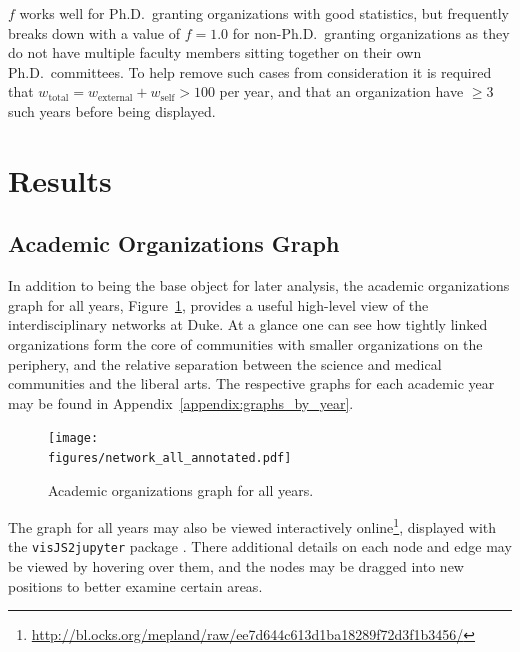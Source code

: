 \documentclass[notitlepage,aps,prd,nofootinbib]{revtex4-1}
\newcommand{\figures}{../outputs/plots}
\begin{document}
$f$ works well for Ph.D.\ granting organizations with good statistics, but frequently breaks down with a value of $f=1.0$ for non-Ph.D.\ granting organizations as they do not have multiple faculty members sitting together on their own Ph.D.\ committees. To help remove such cases from consideration it is required that $w_{\text{total}} = w_{\text{external}} + w_{\text{self}} > 100$ per year, and that an organization have $\geq 3$ such years before being displayed.


\section{Results}
\subsection{Academic Organizations Graph}

In addition to being the base object for later analysis, the academic organizations graph for all years, Figure~\ref{fig:graph_all_years}, provides a useful high-level view of the interdisciplinary networks at Duke. At a glance one can see how tightly linked organizations form the core of communities with smaller organizations on the periphery, and the relative separation between the science and medical communities and the liberal arts. The respective graphs for each academic year may be found in Appendix~\ref{appendix:graphs_by_year}.

\begin{figure}[!htb]\centering
  \texttt{[image: \\figures/network\_all\_annotated.pdf]}
  \caption{Academic organizations graph for all years.}
  \label{fig:graph_all_years}
\end{figure}

The graph for all years may also be viewed interactively online\footnote{\url{http://bl.ocks.org/mepland/raw/ee7d644c613d1ba18289f72d3f1b3456/}}, displayed with the \texttt{visJS2jupyter} package \cite{visJS2jupyter}. There additional details on each node and edge may be viewed by hovering over them, and the nodes may be dragged into new positions to better examine certain areas.
\end{document}
